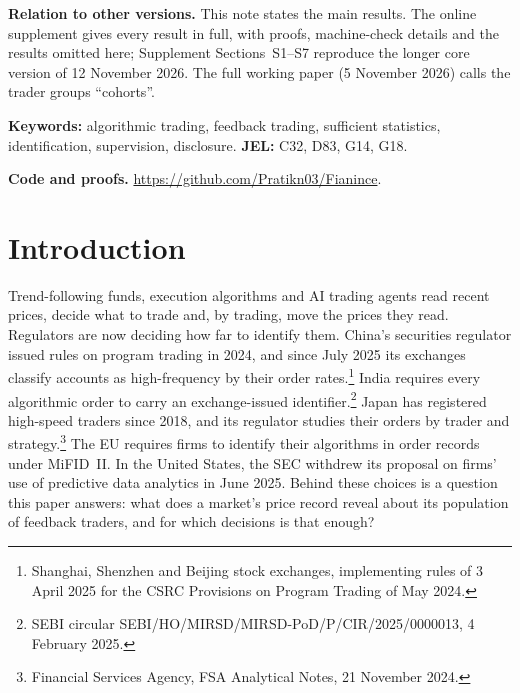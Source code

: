 \begin{abstract}
\noindent Algorithmic traders read prices and, by trading, move them. Populations with the same feedback kernel produce identical prices, profits and equilibria; prices identify nothing finer, and learning composition costs data of order $(\Delta\eta)^{-(4K-2)}$, even near instability, so targeted supervision needs tagged flow. In a pre-registered out-of-sample test on Taiwan's tagged exchange flows (2019--2023), prices improve forecasts of foreign investors' flow as the registered criterion requires, but a pre-specified check attributes the gain to prices revealing past flow rather than to feedback. A registered test of the position-limit prediction on Binance perpetual futures is inconclusive. Core results are machine-checked in Lean~4.
\end{abstract}

\noindent\textbf{Relation to other versions.} This note states the main results. The online supplement gives every result in full, with proofs, machine-check details and the results omitted here; Supplement Sections~S1--S7 reproduce the longer core version of 12 November 2026. The full working paper (5 November 2026) calls the trader groups ``co\-horts''.

\noindent\textbf{Keywords:} algorithmic trading, feedback trading, sufficient statistics, identification, supervision, disclosure. \textbf{JEL:} C32, D83, G14, G18.

\noindent\textbf{Code and proofs.} \url{https://github.com/Pratikn03/Fianince}.

\endgroup
\newpage
\pagestyle{fancy}
\setcounter{page}{1}

\section{Introduction}\label{n:intro}

Trend-following funds, execution algorithms and AI trading agents read recent prices, decide what to trade and, by trading, move the prices they read. Regulators are now deciding how far to identify them. China's securities regulator issued rules on program trading in 2024, and since July 2025 its exchanges classify accounts as high-frequency by their order rates.\footnote{Shanghai, Shenzhen and Beijing stock exchanges, implementing rules of 3 April 2025 for the CSRC Provisions on Program Trading of May 2024.} India requires every algorithmic order to carry an exchange-issued identifier.\footnote{SEBI circular SEBI/HO/MIRSD/MIRSD-PoD/P/CIR/2025/0000013, 4 February 2025.} Japan has registered high-speed traders since 2018, and its regulator studies their orders by trader and strategy.\footnote{Financial Services Agency, FSA Analytical Notes, 21 November 2024.} The EU requires firms to identify their algorithms in order records under MiFID~II. In the United States, the SEC withdrew its proposal on firms' use of predictive data analytics in June 2025. Behind these choices is a question this paper answers: what does a market's price record reveal about its population of feedback traders, and for which decisions is that enough?

